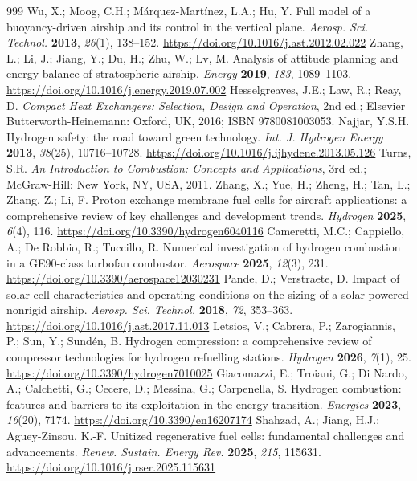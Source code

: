 \documentclass[applsci,article,submit,pdftex,moreauthors]{Definitions/mdpi}
\begin{document}
\begin{thebibliography}{999}
 Wu, X.; Moog, C.H.; Márquez-Martínez, L.A.; Hu, Y. Full model of a buoyancy-driven airship and its control in the vertical plane. \textit{Aerosp. Sci. Technol.} \textbf{2013}, \textit{26}(1), 138--152. \url{https://doi.org/10.1016/j.ast.2012.02.022}
 Zhang, L.; Li, J.; Jiang, Y.; Du, H.; Zhu, W.; Lv, M. Analysis of attitude planning and energy balance of stratospheric airship. \textit{Energy} \textbf{2019}, \textit{183}, 1089--1103. \url{https://doi.org/10.1016/j.energy.2019.07.002}
 Hesselgreaves, J.E.; Law, R.; Reay, D. \textit{Compact Heat Exchangers: Selection, Design and Operation}, 2nd ed.; Elsevier Butterworth-Heinemann: Oxford, UK, 2016; ISBN 9780081003053.
 Najjar, Y.S.H. Hydrogen safety: the road toward green technology. \textit{Int. J. Hydrogen Energy} \textbf{2013}, \textit{38}(25), 10716--10728. \url{https://doi.org/10.1016/j.ijhydene.2013.05.126}
 Turns, S.R. \textit{An Introduction to Combustion: Concepts and Applications}, 3rd ed.; McGraw-Hill: New York, NY, USA, 2011.
 Zhang, X.; Yue, H.; Zheng, H.; Tan, L.; Zhang, Z.; Li, F. Proton exchange membrane fuel cells for aircraft applications: a comprehensive review of key challenges and development trends. \textit{Hydrogen} \textbf{2025}, \textit{6}(4), 116. \url{https://doi.org/10.3390/hydrogen6040116}
 Cameretti, M.C.; Cappiello, A.; De Robbio, R.; Tuccillo, R. Numerical investigation of hydrogen combustion in a GE90-class turbofan combustor. \textit{Aerospace} \textbf{2025}, \textit{12}(3), 231. \url{https://doi.org/10.3390/aerospace12030231}
 Pande, D.; Verstraete, D. Impact of solar cell characteristics and operating conditions on the sizing of a solar powered nonrigid airship. \textit{Aerosp. Sci. Technol.} \textbf{2018}, \textit{72}, 353--363. \url{https://doi.org/10.1016/j.ast.2017.11.013}
 Letsios, V.; Cabrera, P.; Zarogiannis, P.; Sun, Y.; Sundén, B. Hydrogen compression: a comprehensive review of compressor technologies for hydrogen refuelling stations. \textit{Hydrogen} \textbf{2026}, \textit{7}(1), 25. \url{https://doi.org/10.3390/hydrogen7010025}
 Giacomazzi, E.; Troiani, G.; Di Nardo, A.; Calchetti, G.; Cecere, D.; Messina, G.; Carpenella, S. Hydrogen combustion: features and barriers to its exploitation in the energy transition. \textit{Energies} \textbf{2023}, \textit{16}(20), 7174. \url{https://doi.org/10.3390/en16207174}
 Shahzad, A.; Jiang, H.J.; Aguey-Zinsou, K.-F. Unitized regenerative fuel cells: fundamental challenges and advancements. \textit{Renew. Sustain. Energy Rev.} \textbf{2025}, \textit{215}, 115631. \url{https://doi.org/10.1016/j.rser.2025.115631}

\end{thebibliography}
\end{document}
